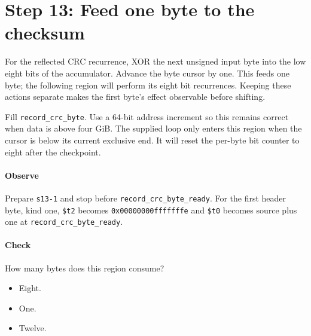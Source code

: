 \section{Step 13: Feed one byte to the checksum}
For the reflected CRC recurrence, XOR the next unsigned input byte into the
low eight bits of the accumulator. Advance the byte cursor by one. This feeds
one byte; the following region will perform its eight bit recurrences. Keeping
these actions separate makes the first byte's effect observable before shifting.

Fill \texttt{record\_crc\_byte}. Use a 64-bit address increment so this remains
correct when data is above four GiB. The supplied loop only enters this region
when the cursor is below its current exclusive end. It will reset the per-byte
bit counter to eight after the checkpoint.

\paragraph{Observe} Prepare \texttt{s13-1} and stop before
\texttt{record\_crc\_byte\_ready}. For the first header byte, kind one, \texttt{\$t2} becomes
\texttt{0x00000000fffffffe} and \texttt{\$t0} becomes source plus one at
\texttt{record\_crc\_byte\_ready}.

\paragraph{Check} How many bytes does this region consume?
\begin{itemize}
  \item[A.] Eight.
  \item[B.] One.
  \item[C.] Twelve.
\end{itemize}
